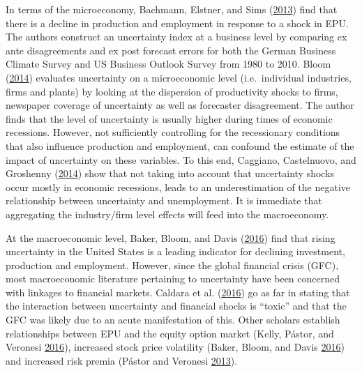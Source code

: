 \documentclass[11pt,preprint, authoryear]{elsarticle}
\numberwithin{equation}{section}
\numberwithin{figure}{section}
\numberwithin{table}{section}
\begin{document}
In terms of the microeconomy, Bachmann, Elstner, and Sims
(\protect\hyperlink{ref-Bachmann2013}{2013}) find that there is a
decline in production and employment in response to a shock in EPU. The authors construct an uncertainty index at a business level by comparing ex ante disagreements and ex post forecast errors for both the German Business Climate Survey and US Business Outlook Survey from 1980 to 2010. Bloom (\protect\hyperlink{ref-Bloom2014}{2014}) evaluates uncertainty on a microeconomic level (i.e.~individual industries, firms and plants) by looking at the dispersion of productivity shocks to firms, newspaper coverage of uncertainty as well as forecaster disagreement. The author finds that the level of uncertainty is usually higher during times of economic recessions. However, not sufficiently controlling for the recessionary conditions that also influence production and employment, can confound the estimate of the impact of uncertainty on these variables. To this end, Caggiano, Castelnuovo, and Groshenny (\protect\hyperlink{ref-Caggiano2014}{2014}) show that not taking into account that uncertainty shocks occur mostly in economic recessions, leads to an underestimation of the negative relationship between uncertainty and unemployment. It is immediate that aggregating the industry/firm level effects will feed into the macroeconomy.

At the macroeconomic level, Baker, Bloom, and Davis
(\protect\hyperlink{ref-Baker2016}{2016}) find that rising uncertainty
in the United States is a leading indicator for declining investment,
production and employment. However, since the global financial crisis
(GFC), most macroeconomic literature pertaining to uncertainty have been
concerned with linkages to financial markets. Caldara et al.
(\protect\hyperlink{ref-Caldara2016}{2016}) go as far in stating that
the interaction between uncertainty and financial shocks is ``toxic''
and that the GFC was likely due to an acute manifestation of this. Other
scholars establish relationships between EPU and the equity option
market (Kelly, Pástor, and Veronesi
\protect\hyperlink{ref-Kelly2016}{2016}), increased stock price
volatility (Baker, Bloom, and Davis
\protect\hyperlink{ref-Baker2016}{2016}) and increased risk premia
(Pástor and Veronesi \protect\hyperlink{ref-Pastor2013}{2013}).
\end{document}
